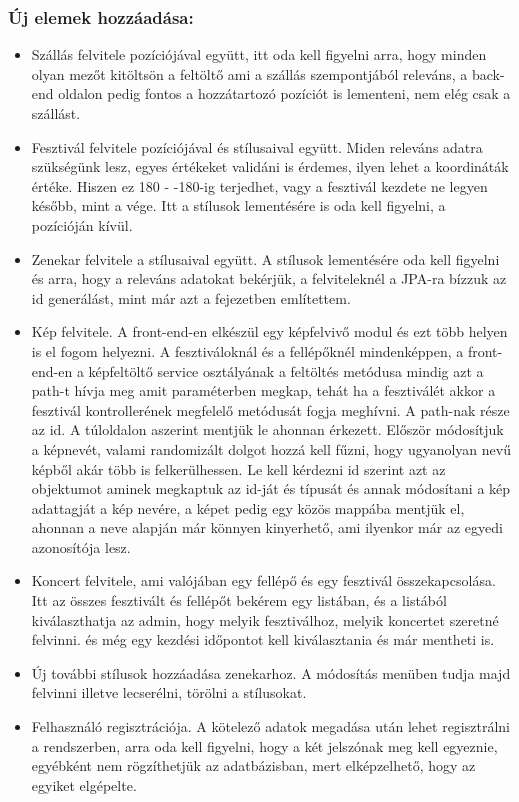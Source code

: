 \subsubsection{Új elemek hozzáadása:}
\begin{itemize}
\item Szállás felvitele pozíciójával együtt, itt oda kell figyelni arra, hogy minden olyan mezőt kitöltsön a feltöltő ami a szállás szempontjából releváns, a back-end oldalon pedig fontos a hozzátartozó pozíciót is lementeni, nem elég csak a szállást.

\item Fesztivál felvitele pozíciójával és stílusaival együtt. Miden releváns adatra szükségünk lesz, egyes értékeket validáni is érdemes, ilyen lehet a koordináták értéke. Hiszen ez 180 - -180-ig terjedhet, vagy a fesztivál kezdete ne legyen később, mint a vége. Itt a stílusok lementésére is oda kell figyelni, a pozícióján kívül.

\item Zenekar felvitele a stílusaival együtt. A stílusok lementésére oda kell figyelni és arra, hogy a releváns adatokat bekérjük, a felviteleknél a JPA-ra bízzuk az id generálást, mint már azt a fejezetben említettem.

\item Kép felvitele. A front-end-en elkészül egy képfelvivő modul és ezt több helyen is el fogom helyezni. A fesztiváloknál és a fellépőknél mindenképpen, a front-end-en a képfeltöltő service osztályának a feltöltés metódusa mindig azt a path-t hívja meg amit paraméterben megkap, tehát ha a fesztiválét akkor a fesztivál kontrollerének megfelelő metódusát fogja meghívni. A path-nak része az id. A túloldalon aszerint mentjük le ahonnan érkezett. Először módosítjuk a képnevét, valami randomizált dolgot hozzá kell fűzni, hogy ugyanolyan nevű képből akár több is felkerülhessen. Le kell kérdezni id szerint azt az objektumot aminek megkaptuk az id-ját és típusát és annak módosítani a kép adattagját a kép nevére, a képet pedig egy közös mappába mentjük el, ahonnan a neve alapján már könnyen kinyerhető, ami ilyenkor már az egyedi azonosítója lesz.

\item Koncert felvitele, ami valójában egy fellépő és egy fesztivál összekapcsolása. Itt az összes fesztivált és fellépőt bekérem egy listában, és a listából kiválaszthatja az admin, hogy melyik fesztiválhoz, melyik koncertet szeretné felvinni. és még egy kezdési időpontot kell kiválasztania és már mentheti is.

\item Új további stílusok hozzáadása zenekarhoz. A módosítás menüben tudja majd felvinni illetve lecserélni, törölni a stílusokat.

\item Felhasználó regisztrációja. A kötelező adatok megadása után lehet regisztrálni a rendszerben, arra oda kell figyelni, hogy a két jelszónak meg kell egyeznie, egyébként nem rögzíthetjük az adatbázisban, mert elképzelhető, hogy az egyiket elgépelte.
\end{itemize}

